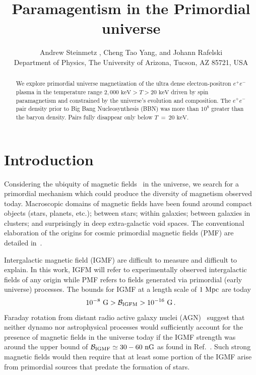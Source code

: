 \documentclass[a4paper]{article}
\title{\boldmath Paramagentism in the Primordial universe}
\author{Andrew Steinmetz\orc{\orcC}%
, Cheng Tao Yang\orc{\orcB}, and Johann Rafelski\orc{\orcA}\\ Department of Physics, The University of Arizona, Tucson, AZ 85721, USA}
\newcommand*{\keV}{\text{ keV}}
\newcommand*{\xblue}{\color{black}}
\begin{document}
\maketitle

\begin{abstract}
    {\xblue We explore primordial universe magnetization of the ultra dense electron-positron $e^{+}e^{-}$ plasma in the temperature range $2,000\keV>T>20\keV$ driven by spin paramagnetism and constrained by the universe's evolution and composition.} The $e^{+}e^{-}$ pair density {\xblue prior to Big Bang Nucleosynthesis (BBN)} was more than $10^{8}$ greater than the baryon density. Pairs fully disappear only below $T~=~20\keV$.
\end{abstract}


\section{Introduction}
\label{sec:introduction}
\noindent  
Considering the ubiquity of magnetic fields~\cite{giovannini2003magnetized,kronberg1994extragalactic} in the universe, we search for a primordial mechanism which could produce {\xblue the diversity of magnetism observed today.} Macroscopic domains of magnetic fields have been found around compact objects (stars, planets, etc.); between stars; within galaxies; between galaxies in clusters; and surprisingly in deep extra-galactic void spaces. The conventional elaboration of the origins for cosmic  primordial magnetic fields (PMF) are detailed in~\cite{gaensler2004origin,durrer2013cosmological,batista2021gammaray}.

Intergalactic magnetic field (IGMF) are  difficult to measure and difficult to explain. {\xblue In this work, IGFM will refer to experimentally observed intergalactic fields of any origin while PMF refers to fields generated via primordial (early universe) processes.} The bounds for IGMF at a length scale of $1{\rm\ Mpc}$ are today~\cite{neronov2010evidence,taylor2011extragalactic,pshirkov2015new,jedamzik2019stringent,vernstrom2021discovery}
\begin{align}
    \label{igmf}
    10^{-8}{\rm\ G}>\mathcal{B}_{\rm IGFM}>10^{-16}{\rm\ G}\,.
\end{align}
Faraday rotation from distant radio active galaxy nuclei (AGN)~\cite{pomakov2022redshift} suggest that neither dynamo nor astrophysical processes would sufficiently account for the presence of magnetic fields in the universe today if the IGMF strength was around the upper bound of ${\cal B}_{\rm IGMF}\simeq30-60{\rm\ nG}$ as found in Ref.~\cite{vernstrom2021discovery}. Such strong magnetic fields would then require that at least some portion of the IGMF arise from primordial sources that predate the formation of stars.
\end{document}
